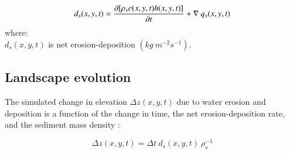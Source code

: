 \documentclass[final,3p,times,twocolumn]{elsarticle}
\begin{document}
\begin{equation}\label{eq:sediment} 
d_s(x,y,t) = 
{\partial [\rho_sc(x,y,t)h(x,y,t)] \over \partial t} +
\nabla ~ q_s(x,y,t)
\end{equation}
%
{\small
\noindent
where: \\
\hspace*{0.5em} $d_s(x,y,t)$ is net erosion-deposition $(kg ~ m^{-2} s^{-1})$.\\
}




\subsection{Landscape evolution}
The simulated change in elevation $\Delta z(x,y,t)$ due to water erosion and deposition
is a function of
the change in time, the net erosion-deposition rate, and the sediment mass density 
\cite{mitasova2013}:

\begin{equation}
\label{eq:evolution} 
{\Delta z(x,y,t) = \Delta t ~ d_s(x,y,t) ~ \rho_s^{-1} }
\end{equation}

\end{document}
